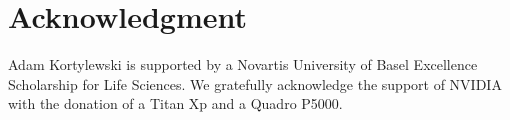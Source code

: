 \documentclass[10pt,twocolumn,letterpaper]{article}
\begin{document}
	
	

	 

	\section*{Acknowledgment} Adam Kortylewski is supported by a Novartis University of Basel Excellence Scholarship for Life Sciences. We gratefully acknowledge the support of NVIDIA with the donation of a Titan Xp and a Quadro P5000.

	

	
	
	  
\end{document}
